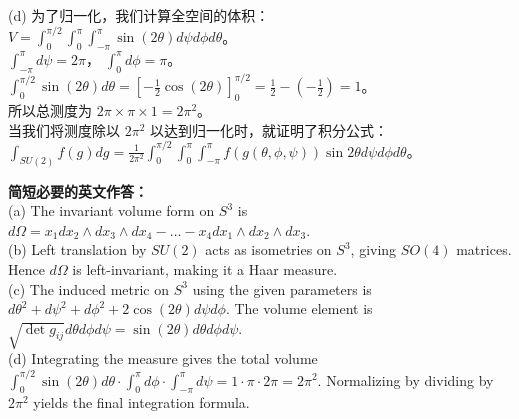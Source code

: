 \documentclass{ctexart}
\begin{document}
(d) 为了归一化，我们计算全空间的体积：\\
$V = \int_0^{\pi/2} \int_0^\pi \int_{-\pi}^\pi \sin(2\theta) d\psi d\phi d\theta$。\\
$\int_{-\pi}^\pi d\psi = 2\pi$， $\int_0^\pi d\phi = \pi$。\\
$\int_0^{\pi/2} \sin(2\theta) d\theta = \left[-\frac{1}{2}\cos(2\theta)\right]_0^{\pi/2} = \frac{1}{2} - \left(-\frac{1}{2}\right) = 1$。\\
所以总测度为 $2\pi \times \pi \times 1 = 2\pi^2$。\\
当我们将测度除以 $2\pi^2$ 以达到归一化时，就证明了积分公式：\\
$\int_{SU(2)} f(g) dg = \frac{1}{2\pi^2} \int_0^{\pi/2} \int_0^\pi \int_{-\pi}^\pi f(g(\theta, \phi, \psi)) \sin 2\theta d\psi d\phi d\theta$。

\vspace{1em}
\textbf{简短必要的英文作答：}\\
(a) The invariant volume form on $S^3$ is $d\Omega = x_1 dx_2 \wedge dx_3 \wedge dx_4 - \dots - x_4 dx_1 \wedge dx_2 \wedge dx_3$.\\
(b) Left translation by $SU(2)$ acts as isometries on $S^3$, giving $SO(4)$ matrices. Hence $d\Omega$ is left-invariant, making it a Haar measure.\\
(c) The induced metric on $S^3$ using the given parameters is $d\theta^2 + d\psi^2 + d\phi^2 + 2\cos(2\theta)d\psi d\phi$. The volume element is $\sqrt{\det g_{ij}} d\theta d\phi d\psi = \sin(2\theta) d\theta d\phi d\psi$.\\
(d) Integrating the measure gives the total volume $\int_0^{\pi/2} \sin(2\theta)d\theta \cdot \int_0^\pi d\phi \cdot \int_{-\pi}^\pi d\psi = 1 \cdot \pi \cdot 2\pi = 2\pi^2$. Normalizing by dividing by $2\pi^2$ yields the final integration formula.
\end{document}

